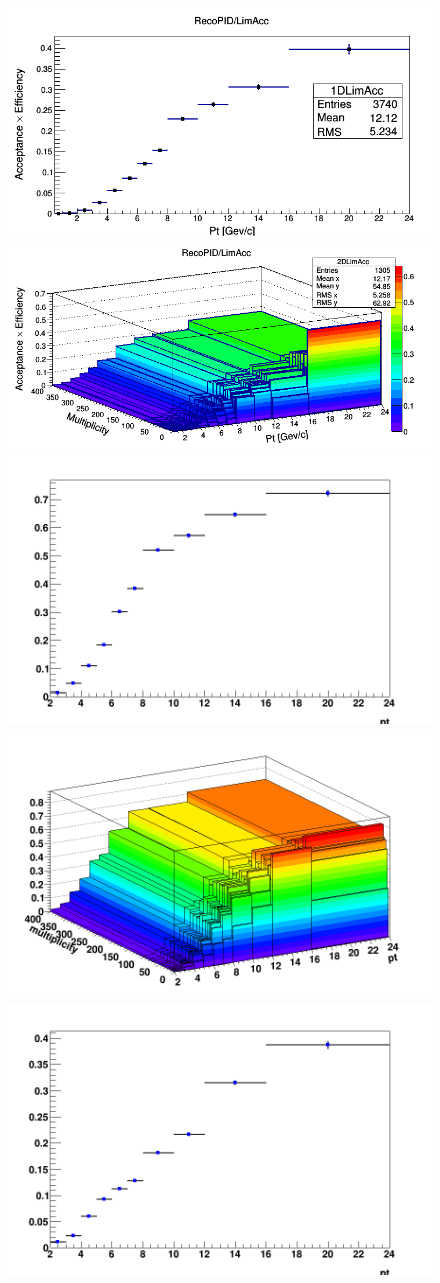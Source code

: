 \begin{figure}[!htp]     %
	\centering
	\includegraphics[width=.48\linewidth]{figures/Effs/EfficiencyMap_1D_DPlus_c_Ref_wLimAcc_Plot.png}  %
	\includegraphics[width=.48\linewidth]{figures/Effs/EfficiencyMap_2D_DPlus_c_Ref_wLimAcc_Plot.png} 
	\includegraphics[width=.48\linewidth]{figures/Effs/EfficiencyMap_1D_DStar_c_Ref_wLimAcc_Plot.png}  %
	\includegraphics[width=.48\linewidth]{figures/Effs/EfficiencyMap_2D_DStar_c_Ref_wLimAcc_Plot.png} 
	\includegraphics[width=.48\linewidth]{figures/Effs/EfficiencyMap_1D_Dzero_c_Ref_wLimAcc_Plot.png}  %

\end{figure}
